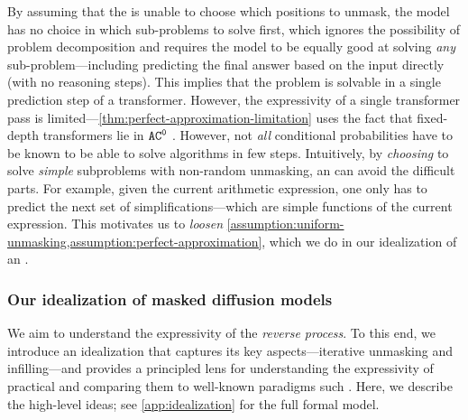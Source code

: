 \documentclass{article} %
\begin{document}
By assuming that the \MDMAcr is unable to choose which positions to unmask, the model has no choice in which sub-problems to solve first, which ignores the possibility of problem decomposition and requires the model to be equally good at solving \emph{any} sub-problem---including predicting the final answer based on the input directly (with no reasoning steps).
This implies that the problem is solvable in a single prediction step of a transformer.
However, the expressivity of a single transformer pass is limited---\cref{thm:perfect-approximation-limitation} uses the fact that fixed-depth transformers lie in ${{{{{{\mathtt{AC}}}^{\mathtt{0}}}}}}$ \citep{li2024chain}.
However, not \emph{all} conditional probabilities have to be known to be able to solve algorithms in few steps.
Intuitively, by \emph{choosing} to solve \emph{simple} subproblems with non-random unmasking, an \MDMAcr can avoid the difficult parts.
For example, given the current arithmetic expression, one only has to predict the next set of simplifications---which are simple functions of the current expression.
This motivates us to \emph{loosen} \cref{assumption:uniform-unmasking,assumption:perfect-approximation}, which we do in our idealization of an \MDMAcr.
   
\subsubsection{Our idealization of masked diffusion models} \label{sec:idealization}

We aim to understand the expressivity of the \emph{reverse process}. 
To this end, we introduce an idealization that captures its key aspects---iterative unmasking and infilling---and provides a principled lens for understanding the expressivity of practical \MDMsAcr and comparing them to well-known paradigms such \CoTAcr. 
Here, we describe the high-level ideas; see \cref{app:idealization} for the full formal model.
\end{document}
